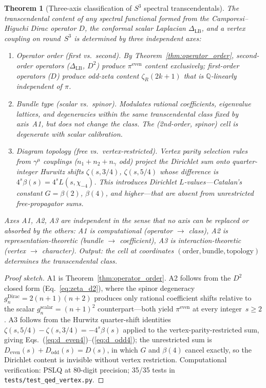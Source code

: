 \documentclass[aps,pra,twocolumn,superscriptaddress,longbibliography]{revtex4-2}
\newtheorem{theorem}{Theorem}
\begin{document}
\begin{theorem}[Three-axis classification of $S^3$ spectral
transcendentals]
\label{thm:three_axis}
The transcendental content of any spectral functional formed
from the Camporesi--Higuchi Dirac operator $D$, the conformal
scalar Laplacian $\Delta_{\mathrm{LB}}$, and a vertex coupling
on round~$S^3$ is determined by three independent axes:
\begin{enumerate}
\item[(A1)] \emph{Operator order} (first vs.\ second).
By Theorem~\ref{thm:operator_order}, second-order operators
($\Delta_{\mathrm{LB}}$, $D^2$) produce $\pi^{\mathrm{even}}$
content exclusively; first-order operators ($D$) produce odd-zeta
content $\zeta_R(2k{+}1)$ that is $\mathbb{Q}$-linearly independent
of $\pi$.
\item[(A2)] \emph{Bundle type} (scalar vs.\ spinor).
Modulates rational coefficients, eigenvalue lattices, and
degeneracies within the same transcendental class fixed by
axis~A1, but does not change the class.  The (2nd-order, spinor)
cell is degenerate with scalar calibration.
\item[(A3)] \emph{Diagram topology} (free vs.\ vertex-restricted).
Vertex parity selection rules from $\gamma^\mu$ couplings
($n_1 + n_2 + n_\gamma$ odd) project the Dirichlet sum onto
quarter-integer Hurwitz shifts $\zeta(s, 3/4)$, $\zeta(s, 5/4)$
whose difference is $4^s \beta(s) = 4^s L(s, \chi_{-4})$.  This
introduces Dirichlet $L$-values---Catalan's constant
$G = \beta(2)$, $\beta(4)$, and higher---that are absent from
unrestricted free-propagator sums.
\end{enumerate}
Axes A1, A2, A3 are independent in the sense that no axis can be
replaced or absorbed by the others: A1 is computational (operator
$\to$ class), A2 is representation-theoretic (bundle $\to$
coefficient), A3 is interaction-theoretic (vertex
$\to$ character).  Output: the cell at coordinates
$(\mathrm{order}, \mathrm{bundle}, \mathrm{topology})$ determines
the transcendental class.
\end{theorem}

\begin{proof}[Proof sketch]
A1 is Theorem~\ref{thm:operator_order}.  A2 follows from the
$D^2$ closed form (Eq.~\ref{eq:zeta_d2}), where the spinor degeneracy
$g_n^{\mathrm{Dirac}} = 2(n+1)(n+2)$ produces only rational
coefficient shifts relative to the scalar $g_n^{\mathrm{scalar}} =
(n+1)^2$ counterpart---both yield $\pi^{\mathrm{even}}$ at every
integer~$s \ge 2$.  A3 follows from the Hurwitz quarter-shift
identities $\zeta(s, 5/4) - \zeta(s, 3/4) = -4^s \beta(s)$ applied
to the vertex-parity-restricted sum, giving
Eqs.~(\ref{eq:d_even4})--(\ref{eq:d_odd4}); the unrestricted sum is
$D_{\mathrm{even}}(s) + D_{\mathrm{odd}}(s) = D(s)$, in which $G$
and $\beta(4)$ cancel exactly, so the Dirichlet content is invisible
without vertex restriction.  Computational verification: PSLQ at
80-digit precision; 35/35 tests in
\texttt{tests/test\_qed\_vertex.py}.
\end{proof}
\end{document}
